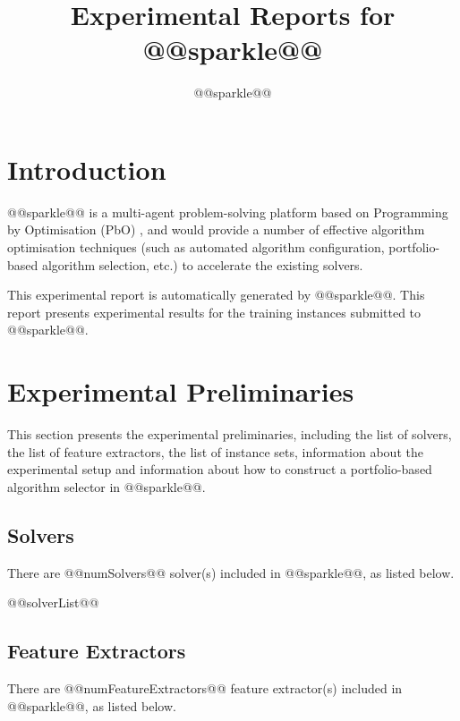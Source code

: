 \documentclass[british]{article}
\title{Experimental Reports for @@sparkle@@ }
\author{ @@sparkle@@ }
\newif\iftest
\begin{document}
\maketitle %


\section{Introduction}
\label{sec:Introduction}

@@sparkle@@ \cite{Hoos15} is a multi-agent problem-solving platform based on Programming by Optimisation (PbO) \cite{Hoos12}, and would provide a number of effective algorithm optimisation techniques (such as automated algorithm configuration, portfolio-based algorithm selection, etc.) to accelerate the existing solvers.

This experimental report is automatically generated by @@sparkle@@. This report presents experimental results for the training instances submitted to @@sparkle@@\iftest, as well as for running the @@sparkle@@ portfolio selector to solve the test instances in the instance set @@testInstanceClass@@\fi.

\section{Experimental Preliminaries}
\label{sec:Experimental_Preliminaries}

This section presents the experimental preliminaries, including the list of solvers, the list of feature extractors, the list of instance sets, information about the experimental setup and information about how to construct a portfolio-based algorithm selector in @@sparkle@@.

\subsection{Solvers}
\label{sec:Solvers}
There are @@numSolvers@@ solver(s) included in @@sparkle@@, as listed below.

\begin{enumerate} 
@@solverList@@
\end{enumerate}

\subsection{Feature Extractors}
\label{sec:Feature_Extractors}
There are @@numFeatureExtractors@@ feature extractor(s) included in @@sparkle@@, as listed below.
\end{document}
